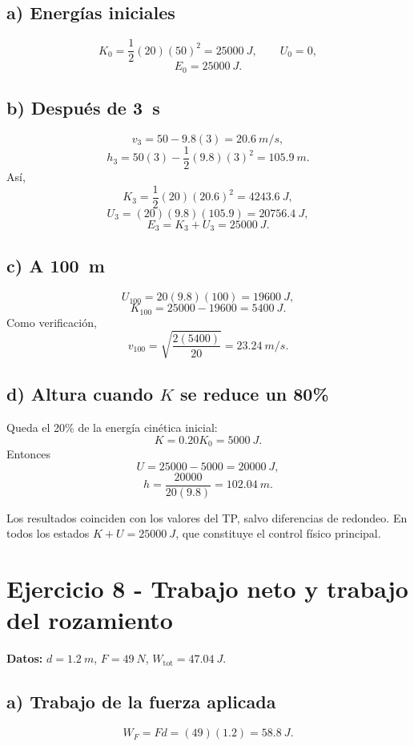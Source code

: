 \documentclass[11pt,a4paper]{article}
\begin{document}
\subsection*{a) Energías iniciales}
\[
K_0=\frac12(20)(50)^2=\boxed{\SI{25000}{J}},\qquad U_0=0,
\]
\[
E_0=\boxed{\SI{25000}{J}}.
\]

\subsection*{b) Después de \SI{3}{s}}
\[
v_3=50-9.8(3)=\SI{20.6}{m/s},
\]
\[
h_3=50(3)-\frac12(9.8)(3)^2=\SI{105.9}{m}.
\]
Así,
\[
K_3=\frac12(20)(20.6)^2=\boxed{\SI{4243.6}{J}},
\]
\[
U_3=(20)(9.8)(105.9)=\boxed{\SI{20756.4}{J}},
\]
\[
E_3=K_3+U_3=\boxed{\SI{25000}{J}}.
\]

\subsection*{c) A \SI{100}{m}}
\[
U_{100}=20(9.8)(100)=\boxed{\SI{19600}{J}},
\]
\[
K_{100}=25000-19600=\boxed{\SI{5400}{J}}.
\]
Como verificación,
\[
v_{100}=\sqrt{\frac{2(5400)}{20}}=\SI{23.24}{m/s}.
\]

\subsection*{d) Altura cuando \(K\) se reduce un 80\%}
Queda el 20\% de la energía cinética inicial:
\[
K=0.20K_0=\SI{5000}{J}.
\]
Entonces
\[
U=25000-5000=\SI{20000}{J},
\]
\[
h=\frac{20000}{20(9.8)}=\boxed{\SI{102.04}{m}}.
\]

\begin{validacion}
Los resultados coinciden con los valores del TP, salvo diferencias de redondeo. En todos los estados \(K+U=\SI{25000}{J}\), que constituye el control físico principal.
\end{validacion}

\section{Ejercicio 8 - Trabajo neto y trabajo del rozamiento}
\textbf{Datos:} \(d=\SI{1.2}{m}\), \(F=\SI{49}{N}\), \(W_{\mathrm{tot}}=\SI{47.04}{J}\).

\subsection*{a) Trabajo de la fuerza aplicada}
\[
W_F=Fd=(49)(1.2)=\boxed{\SI{58.8}{J}}.
\]
\end{document}
